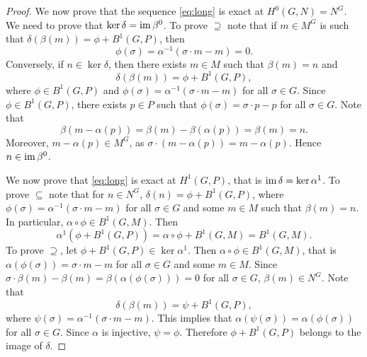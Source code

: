\begin{proof}
    We now prove that the sequence \eqref{eq:long}
    is exact at $H^0(G,N)=N^G$. We need to prove that $\ker\delta=\operatorname{im}\beta^0$. To prove $\supseteq$ note that if $m\in M^G$ is such that 
    $\delta(\beta(m))=\phi+B^1(G,P)$, then 
    \[
    \phi(\sigma)=\alpha^{-1}(\sigma\cdot m-m)=0.
    \]
    Conversely, if $n\in\ker\delta$, then there exists $m\in M$ such that $\beta(m)=n$ and
    \[
    \delta(\beta(m))=\phi+B^1(G,P),
    \]
    where $\phi\in B^1(G,P)$ and 
    $\phi(\sigma)=\alpha^{-1}(\sigma\cdot m-m)$
    for all $\sigma\in G$. Since $\phi\in B^1(G,P)$, there
    exists $p\in P$ such that $\phi(\sigma)=\sigma\cdot p-p$ for all $\sigma\in G$. Note that 
    \[
    \beta(m-\alpha(p))=\beta(m)-\beta(\alpha(p))=\beta(m)=n.
    \]
    Moreover, $m-\alpha(p)\in M^G$, as $\sigma\cdot (m-\alpha(p))=m-\alpha(p)$. Hence $n\in\operatorname{im}\beta^0$. 

    We now prove that \eqref{eq:long} is exact at $H^1(G,P)$, that 
    is $\operatorname{im}\delta=\ker\alpha^1$. To prove
    $\subseteq$ note that 
    for $n\in N^G$, $\delta(n)=\phi+B^1(G,P)$, where 
    $\phi(\sigma)=\alpha^{-1}(\sigma\cdot m-m)$ for all $\sigma\in G$
    and some $m\in M$ such that $\beta(m)=n$. In particular, 
    $\alpha\circ\phi\in B^1(G,M)$. 
    Then
    \[
    \alpha^1(\phi+B^1(G,P))=\alpha\circ\phi+B^1(G,M)=B^1(G,M).
    \]
    To prove $\supseteq$, let $\phi+B^1(G,P)\in\ker\alpha^1$. Then
    $\alpha\circ\phi\in B^1(G,M)$, that is $\alpha(\phi(\sigma))=\sigma\cdot m-m$ for 
    all $\sigma\in G$ and some $m\in M$. Since
    $\sigma\cdot\beta(m)-\beta(m)=\beta(\alpha(\phi(\sigma)))=0$ for all $\sigma\in G$, $\beta(m)\in N^G$. Note that 
    \[
    \delta(\beta(m))=\psi+B^1(G,P),
    \]
    where $\psi(\sigma)=\alpha^{-1}(\sigma\cdot m-m)$. This implies that 
    $\alpha(\psi(\sigma))=\alpha(\phi(\sigma))$ for all $\sigma\in G$. Since 
    $\alpha$ is injective, $\psi=\phi$. Therefore 
    $\phi+B^1(G,P)$ belongs to the image of $\delta$. 


\end{proof}
